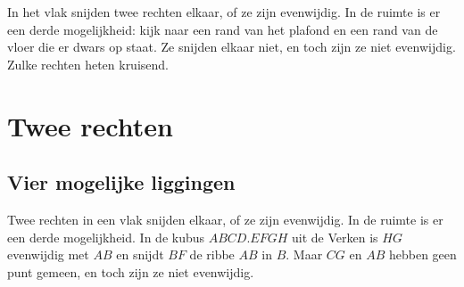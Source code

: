 %



In het vlak snijden twee rechten elkaar, of ze zijn evenwijdig. In de ruimte is er een derde mogelijkheid: kijk naar een rand van het plafond en een rand van de vloer die er dwars op staat. Ze snijden elkaar niet, en toch zijn ze niet evenwijdig. Zulke rechten heten kruisend.

\begin{oefeningen}[Start]

\end{oefeningen}

\section{Twee rechten}

\subsection{Vier mogelijke liggingen}

Twee rechten in een vlak snijden elkaar, of ze zijn evenwijdig. In de ruimte is er een derde mogelijkheid. In de kubus $ABCD.EFGH$ uit de Verken is $HG$ evenwijdig met $AB$ en snijdt $BF$ de ribbe $AB$ in $B$. Maar $CG$ en $AB$ hebben geen punt gemeen, en toch zijn ze niet evenwijdig.

